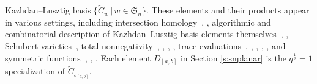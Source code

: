 \documentclass[12pt]{amsart}
\theoremstyle{definition}
\numberwithin{equation}{section}
\newcommand{\sn}{\mathfrak{S}_n}
\newcommand{\qp}[2]{q^{\frac{#1}{#2}}}
\newcommand{\wtc}[2]{\widetilde{C}_{#1}}
\begin{document}
Kazhdan--Lusztig basis $\{ \wtc wq \,|\, w \in \sn \}$.  These elements and their products
appear in various settings, including
intersection homology~\cite{BBDFaisceaux}, \cite{SpringerQACI}, 
algorithmic and combinatorial description of Kazhdan--Lusztig basis elements themselves~\cite{BWHex}, \cite{Deodhar90}, 
Schubert varieties~\cite{BWHex}, total nonnegativity~\cite{GJImm}, \cite{SkanNNDCB}, \cite{StemImm}, \cite{StemConj}, 
trace evaluations~\cite{CHSSkanEKL}, \cite{CSkanTNNChar}, \cite{GreeneImm}, \cite{KLSBasesQMBIndSgn}, \cite{SkanHyperGC}, 
and symmetric functions~\cite{CHSSkanEKL}, \cite{HaimanHecke}, \cite{SkanHyperGC}. 
Each element $D_{[a,b]}$ in Section \ref{s:snplanar} is the $\qp 12 = 1$ specialization of $\wtc{s_{[a,b]}}q$.
\end{document}
